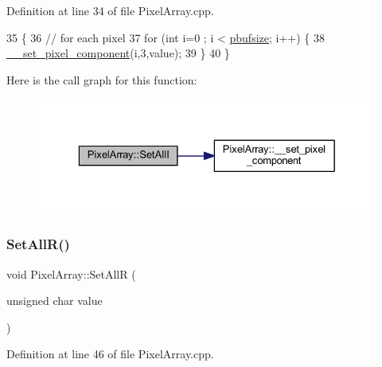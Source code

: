 Definition at line 34 of file Pixel\+Array.\+cpp.


\begin{DoxyCode}
35 \{
36     \textcolor{comment}{// for each pixel}
37     \textcolor{keywordflow}{for} (\textcolor{keywordtype}{int} i=0 ; i < \hyperlink{class_pixel_array_aca29e70f9b643bff3733ab2e694439a1}{pbufsize}; i++) \{
38         \hyperlink{class_pixel_array_a42c6681bf771332826ecc9ad2a8cea02}{\_\_set\_pixel\_component}(i,3,value);
39     \}
40 \}
\end{DoxyCode}
Here is the call graph for this function\+:\nopagebreak
\begin{figure}[H]
\begin{center}
\leavevmode
\includegraphics[width=329pt]{class_pixel_array_a9433e281c3cc0e4f8bbf23e127d8ad2c_cgraph}
\end{center}
\end{figure}
\mbox{\label{class_pixel_array_a9ddfdd1a01a9877e4bfcf5a462412fd2}} 
\subsubsection{\texorpdfstring{Set\+All\+R()}{SetAllR()}}
{\footnotesize\ttfamily void Pixel\+Array\+::\+Set\+AllR (\begin{DoxyParamCaption}\item[{unsigned char}]{value }\end{DoxyParamCaption})}



Definition at line 46 of file Pixel\+Array.\+cpp.


